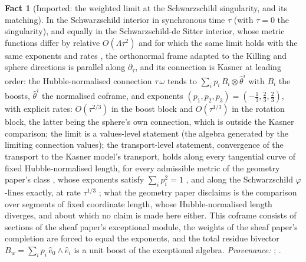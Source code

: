 \documentclass[11pt]{article}
\theoremstyle{definition}
\newtheorem{fact}[theorem]{Fact}
\begin{document}
\begin{fact}[Imported: the weighted limit at the Schwarzschild singularity, and its matching]\label{fact:weightedlimit}
In the Schwarzschild interior in synchronous time $\tau$ (with $\tau = 0$ the singularity), and equally in the Schwarzschild-de Sitter interior, whose metric functions differ by relative $O(\Lambda\tau^2)$ and for which the same limit holds with the same exponents and rates \cite[Thm.~5.9]{ButlerT6}, the orthonormal frame adapted to the Killing and sphere directions is parallel along $\partial_\tau$, and its connection is Kasner at leading order: the Hubble-normalised connection $\tau\,\omega$ tends to $\sum_i p_i\, B_i \otimes \hat\theta^i$ with $B_i$ the boosts, $\hat\theta^i$ the normalised coframe, and exponents $(p_1, p_2, p_3) = (-\tfrac13, \tfrac23, \tfrac23)$, with explicit rates: $O(\tau^{2/3})$ in the boost block and $O(\tau^{1/3})$ in the rotation block, the latter being the sphere's own connection, which is outside the Kasner comparison; the limit is a values-level statement (the algebra generated by the limiting connection values); the transport-level statement, convergence of the transport to the Kasner model's transport, holds along every tangential curve of fixed Hubble-normalised length, for every admissible metric of the geometry paper's class \cite[Def.~5.5]{ButlerT6}, whose exponents satisfy $\sum_i p_i^2 = 1$ \cite[Thm.~5.11]{ButlerT6}, and along the Schwarzschild $\varphi$-lines exactly, at rate $\tau^{1/3}$ \cite[Cor.~5.12]{ButlerT6}; what the geometry paper disclaims is the comparison over segments of fixed coordinate length, whose Hubble-normalised length diverges, and about which no claim is made here either. This coframe consists of sections of the sheaf paper's exceptional module, the weights of the sheaf paper's completion are forced to equal the exponents, and the total residue bivector $B_w = \sum_i p_i\, \hat e_0\wedge\hat e_i$ is a unit boost of the exceptional algebra. \emph{Provenance:} \cite[Lems.~5.1-5.4, Def.~5.5, Thm.~5.6, Thm.~5.9, Thm.~5.11, Cor.~5.12]{ButlerT6}; \cite[Thm.~8.16, Prop.~8.26, Thm.~8.27]{ButlerT4}.
\end{fact}
\end{document}
